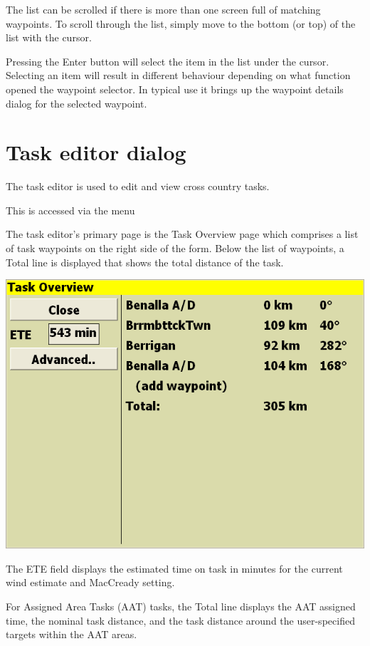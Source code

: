 \documentclass[a4paper,12pt]{refrep}
\begin{document}
The list can be scrolled if there is more than one screen full of
matching waypoints.  To scroll through the list, simply move to the
bottom (or top) of the list with the cursor.  

Pressing the Enter button will select the item in the list under the
cursor.  Selecting an item will result in different behaviour
depending on what function opened the waypoint selector.  In typical
use it brings up the waypoint details dialog for the selected
waypoint.

\section{Task editor dialog}\label{sec:task-editor-dialog}
The task editor is used to edit and view cross country tasks.

This is accessed via the menu
\begin{quote}
\blink{}
\end{quote} 

The task editor's primary page is the Task Overview page which
comprises a list of task waypoints on the right side of the form.
Below the list of waypoints, a Total line is displayed that shows
the total distance of the task.
\begin{center}
\includegraphics[angle=0,width=\linewidth,keepaspectratio='true']{figures/dialog-taskedit0.png}
\end{center}
The ETE field displays the estimated time on task in minutes for the
current wind estimate and MacCready setting.

For Assigned Area Tasks (AAT) tasks, the Total line displays the AAT
assigned time, the nominal task distance, and the task distance around
the user-specified targets within the AAT areas.
\end{document}
